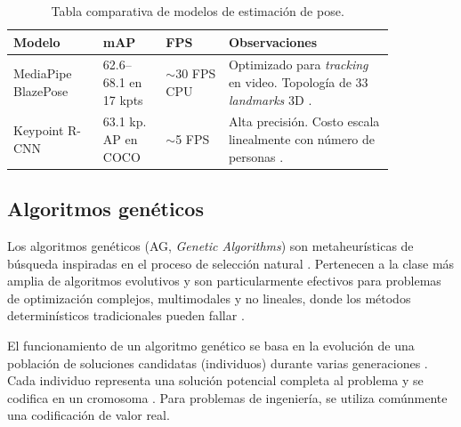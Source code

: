 \begin{table}[htbp]
      \caption{Tabla comparativa de modelos de estimación de pose.}
      \label{tab:comparativa_modelos}
      \centering
      \small
      \begin{tabular}{p{0.20\linewidth}p{0.14\linewidth}p{0.14\linewidth}p{0.37\linewidth}}
            \toprule
            \textbf{Modelo}     & \textbf{mAP}                                          & \textbf{FPS}                                                & \textbf{Observaciones}                                                                                              \\
            \midrule
            MediaPipe BlazePose & 62.6--68.1 en 17 kpts \citep{ar5iv_blazepose_ghum} & $\sim$30 FPS CPU \citep{learnopencv_yolov7_vs_mediapipe} & Optimizado para \textit{tracking} en video. Topología de 33 \textit{landmarks} 3D \citep{googleai_pose_landmarker}. \\
            Keypoint R-CNN      & 63.1 kp. AP en COCO \citep{maskrcnn} & $\sim$5 FPS \citep{maskrcnn}  & Alta precisión. Costo escala linealmente con número de personas \citep{learnopencv_yolov7_vs_mediapipe}.             \\
            \bottomrule
      \end{tabular}
\end{table}

\subsection{Algoritmos genéticos}
\label{ssec:algoritmos-geneticos}

Los algoritmos genéticos (AG, \textit{Genetic Algorithms}) son metaheurísticas
de búsqueda inspiradas en el proceso de selección natural \citep{goldberg1989}. Pertenecen a la clase más amplia de algoritmos evolutivos y
son particularmente efectivos para problemas de optimización complejos,
multimodales y no lineales, donde los métodos determinísticos tradicionales
pueden fallar \citep{goldberg1989}.

El funcionamiento de un algoritmo genético se basa en la evolución de una
población de soluciones candidatas (individuos) durante varias generaciones
\citep{goldberg1989}. Cada individuo representa una solución potencial
completa al problema y se codifica en un cromosoma \citep{goldberg1989}. Para problemas de ingeniería, se utiliza comúnmente una
codificación de valor real.

